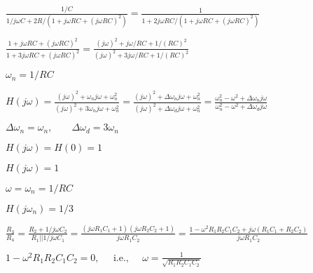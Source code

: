 \documentclass{article}
\def\lthtmlcheckvsize{\ifdim\ht\sizebox<\vsize 
  \ifdim\wd\sizebox<\hsize\expandafter\hfill\fi \expandafter\vfill
  \else\expandafter\vss\fi}%
\begin{document}
{\newpage\clearpage
{}%
$\displaystyle \frac{1/C}{1/j\omega C+2R/(1+j\omega RC+(j\omega RC)^2)}
=\frac{1}{1+2j\omega RC/(1+j\omega RC+(j\omega RC)^2)}$%
\lthtmlindisplaymathZ
\lthtmlcheckvsize\clearpage}

{\newpage\clearpage
{}%
$\displaystyle \frac{1+j\omega RC+(j\omega RC)^2}{1+3j\omega RC+(j\omega RC)^2}
=\frac{(j\omega)^2+j\omega /RC+1/(RC)^2}{(j\omega)^2+3j\omega /RC+1/(RC)^2}$%
\lthtmlindisplaymathZ
\lthtmlcheckvsize\clearpage}

{\newpage\clearpage
{}%
$\omega_n=1/RC$%
\lthtmlindisplaymathZ
\lthtmlcheckvsize\clearpage}

{\newpage\clearpage
{}%
$\displaystyle H(j\omega)=\frac{(j\omega)^2+\omega_n j\omega +\omega_n^2}{(j\omega)^2+3\omega_nj\omega +\omega_n^2}
=\frac{(j\omega)^2+\Delta\omega_n j\omega+\omega_n^2}{(j\omega)^2+\Delta\omega_dj\omega +\omega_n^2}
=\frac{\omega_n^2-\omega^2+\Delta\omega_n j\omega }{\omega_n^2-\omega^2+\Delta\omega_dj\omega}
$%
\lthtmlindisplaymathZ
\lthtmlcheckvsize\clearpage}

{\newpage\clearpage
{}%
$\displaystyle \Delta\omega_n=\omega_n,\;\;\;\;\;\;\;\Delta\omega_d=3\omega_n
$%
\lthtmlindisplaymathZ
\lthtmlcheckvsize\clearpage}

{\newpage\clearpage
{}%
$H(j\omega)=H(0)=1$%
\lthtmlindisplaymathZ
\lthtmlcheckvsize\clearpage}

{\newpage\clearpage
{}%
$H(j\omega)=1$%
\lthtmlindisplaymathZ
\lthtmlcheckvsize\clearpage}

{\newpage\clearpage
{}%
$\omega=\omega_n=1/RC$%
\lthtmlindisplaymathZ
\lthtmlcheckvsize\clearpage}

{\newpage\clearpage
{}%
$H(j\omega_n)=1/3$%
\lthtmlindisplaymathZ
\lthtmlcheckvsize\clearpage}

{\newpage\clearpage
{}%
$\displaystyle \frac{R_3}{R_4}=\frac{R_2+1/j\omega C_2}{R_1||1/j\omega C_1}
=\frac{(j\omega R_1C_1+1)(j\omega R_2C_2+1)}{j\omega R_1C_2}
=\frac{1-\omega^2R_1R_2C_1C_2+j\omega(R_1C_1+R_2C_2)}{j\omega R_1C_2}
$%
\lthtmlindisplaymathZ
\lthtmlcheckvsize\clearpage}

{\newpage\clearpage
{}%
$\displaystyle 1-\omega^2R_1R_2C_1C_2=0,\;\;\;\;\;\mbox{i.e.,}\;\;\;\;\;
\omega=\frac{1}{\sqrt{R_1R_2C_1C_2}}
$%
\lthtmlindisplaymathZ
\lthtmlcheckvsize\clearpage}
\end{document}
